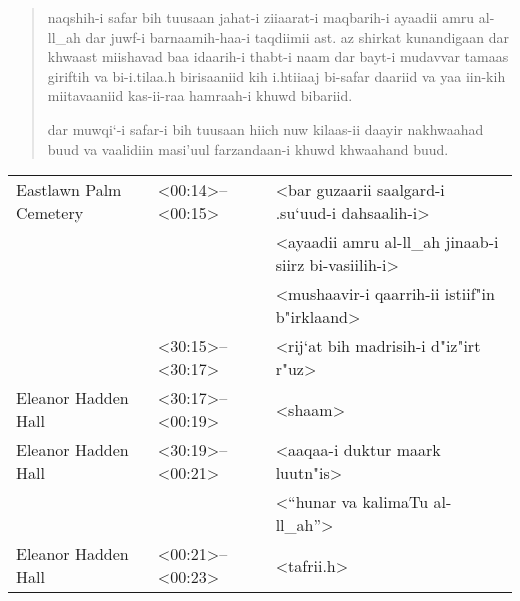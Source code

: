 \documentclass[12pt]{arabart}
\begin{document}
\begin{quote}
\begin{RLtext}
\noindent
naqshih-i safar bih tuusaan jahat-i ziiaarat-i maqbarih-i ayaadii
amru al-ll_ah dar juwf-i barnaamih-haa-i taqdiimii ast. az shirkat
kunandigaan dar khwaast miishavad baa idaarih-i thabt-i naam dar bayt-i
mudavvar tamaas giriftih va bi-i.tilaa.h birisaaniid kih i.htiiaaj
bi-safar daariid va yaa iin-kih miitavaaniid kas-ii-raa hamraah-i
khuwd bibariid.

\noindent
dar muwqi`-i safar-i bih tuusaan hiich nuw kilaas-ii daayir
nakhwaahad buud va vaalidiin masi'uul farzandaan-i khuwd
khwaahand buud.
\end{RLtext}
\end{quote}
\begin{longtable}[c]{p{1.75in}|p{1.1in}|p{2.75in}}
Eastlawn Palm Cemetery & <00:14>--<00:15> & \hfill <bar guzaarii saalgard-i .su`uud-i dahsaalih-i> \\
 & & \hfill <ayaadii amru al-ll_ah jinaab-i siirz bi-vasiilih-i> \\
 & & \hfill <mushaavir-i qaarrih-ii istiif"in b"irklaand> \vspace{1.5ex} \\
 & <30:15>--<30:17> & \hfill <rij`at bih madrisih-i d"iz"irt r"uz> \vspace{1.5ex} \\
Eleanor Hadden Hall & <30:17>--<00:19> & \hfill <shaam> \vspace{1.5ex} \\
Eleanor Hadden Hall & <30:19>--<00:21> & \hfill <aaqaa-i duktur maark luutn"is> \\
 & & \hfill <``hunar va kalimaTu al-ll_ah''> \vspace{1.5ex} \\
Eleanor Hadden Hall & <00:21>--<00:23> & \hfill <tafrii.h> \\
\hline
\end{longtable}
\end{document}
